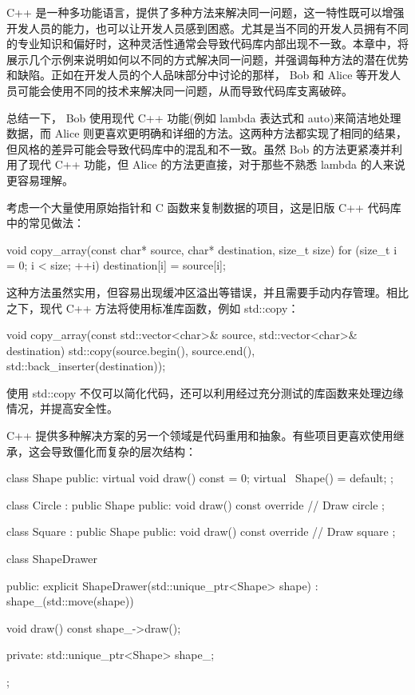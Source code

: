 
C++ 是一种多功能语言，提供了多种方法来解决同一问题，这一特性既可以增强开发人员的能力，也可以让开发人员感到困惑。尤其是当不同的开发人员拥有不同的专业知识和偏好时，这种灵活性通常会导致代码库内部出现不一致。本章中，将展示几个示例来说明如何以不同的方式解决同一问题，并强调每种方法的潜在优势和缺陷。正如在开发人员的个人品味部分中讨论的那样， Bob 和 Alice 等开发人员可能会使用不同的技术来解决同一问题，从而导致代码库支离破碎。


总结一下， Bob 使用现代 C++ 功能(例如 lambda 表达式和 auto)来简洁地处理数据，而 Alice 则更喜欢更明确和详细的方法。这两种方法都实现了相同的结果，但风格的差异可能会导致代码库中的混乱和不一致。虽然 Bob 的方法更紧凑并利用了现代 C++ 功能，但 Alice 的方法更直接，对于那些不熟悉 lambda 的人来说更容易理解。


考虑一个大量使用原始指针和 C 函数来复制数据的项目，这是旧版 C++ 代码库中的常见做法：

\begin{cpp}
void copy_array(const char* source, char* destination, size_t size) {
    for (size_t i = 0; i < size; ++i) {
        destination[i] = source[i];
    }
}
\end{cpp}

这种方法虽然实用，但容易出现缓冲区溢出等错误，并且需要手动内存管理。相比之下，现代 C++ 方法将使用标准库函数，例如 std::copy：

\begin{cpp}
void copy_array(const std::vector<char>& source, std::vector<char>&
destination) {
    std::copy(source.begin(), source.end(), std::back_inserter(destination));
}
\end{cpp}

使用 std::copy 不仅可以简化代码，还可以利用经过充分测试的库函数来处理边缘情况，并提高安全性。


C++ 提供多种解决方案的另一个领域是代码重用和抽象。有些项目更喜欢使用继承，这会导致僵化而复杂的层次结构：

\begin{cpp}
class Shape {
public:
    virtual void draw() const = 0;
    virtual ~Shape() = default;
};

class Circle : public Shape {
public:
    void draw() const override {
        // Draw circle
    }
};

class Square : public Shape {
public:
    void draw() const override {
        // Draw square
    }
};

class ShapeDrawer {
public:
    explicit ShapeDrawer(std::unique_ptr<Shape> shape) : shape_(std::move(shape)) {}

    void draw() const {
        shape_->draw();
    }

private:
    std::unique_ptr<Shape> shape_;
};
\end{cpp}

